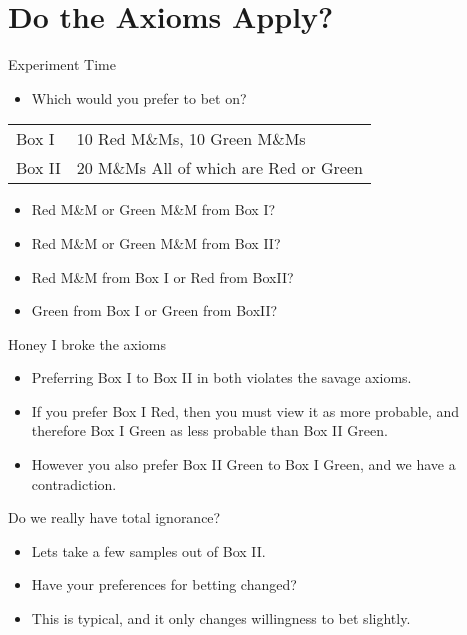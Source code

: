 \documentclass[bigger]{beamer}
\begin{document}
\section{Do the Axioms Apply?}
\label{sec-2}
\begin{frame}[label=sec-2-1]{Experiment Time}
\begin{itemize}
\item Which would you prefer to bet on?
\end{itemize}
\begin{center}
\begin{tabular}{ll}
Box I & 10 Red M\&Ms, 10 Green M\&Ms\\
Box II & 20 M\&Ms All of which are Red or Green\\
\end{tabular}
\end{center}
\begin{itemize}
\item Red M\&M or Green M\&M from Box I?
\item Red M\&M or Green M\&M from Box II?
\item Red M\&M from Box I or Red from BoxII?
\item Green from Box I or Green from BoxII?
\end{itemize}
\end{frame}

\begin{frame}[label=sec-2-2]{Honey I broke the axioms}
\begin{itemize}
\item Preferring Box I to Box II in both violates the savage axioms.
\item If you prefer Box I Red, then you must view it as more probable, and
therefore Box I Green as less probable than Box II Green.
\item However you also prefer Box II Green to Box I Green, and we have a
contradiction.
\end{itemize}
\end{frame}

\begin{frame}[label=sec-2-3]{Do we really have total ignorance?}
\begin{itemize}
\item Lets take a few samples out of Box II.
\item Have your preferences for betting changed?
\item This is typical, and it only changes willingness to bet slightly.
\end{itemize}
\end{frame}
\end{document}

